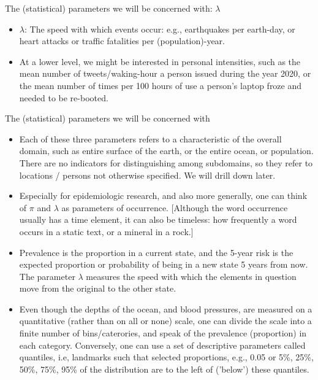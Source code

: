 \documentclass[10pt,handout]{beamer}\usepackage[]{graphicx}\usepackage[]{color}
\begin{document}
\begin{frame}{The (statistical) parameters we will be concerned with: $\lambda$}
	
	
	\begin{itemize}
			
		\item $\lambda$: The speed with which events occur: e.g., earthquakes per earth-day, or heart attacks or traffic fatalities per (population)-year. 
		\item At a lower level, we might be interested in personal intensities, such as the mean number of tweets/waking-hour  a person issued during the year 2020, or the mean number of times per 100 hours of use a person's laptop froze and needed to be re-booted.
		
	\end{itemize}
	
\end{frame}



\begin{frame}{The (statistical) parameters we will be concerned with}
	
	
	\begin{itemize}
		\item Each of these three parameters refers to a characteristic of the overall domain, such as entire surface of the earth, or the entire ocean, or population. There are no indicators for distinguishing among subdomains, so they refer to locations / persons not otherwise specified. We will drill down  later. \pause 
		
		\item Especially for epidemiologic research, and also more generally, one can think  of $\pi$ and $\lambda$ as  parameters of occurrence. [Although the word occurrence usually has a time element, it can also be timeless: how frequently a word occurs in a static text, or a mineral in a rock.] \pause 
		
		\item Prevalence is the proportion in a current state, and the 5-year risk is the expected proportion or probability of being in a new state 5 years from now. The  parameter $\lambda$ measures the speed with which the  elements in question move from the original to the other state.\pause 
		
		\item Even though the depths of the ocean, and blood pressures, are measured on a quantitative (rather than on all or none) scale, one can divide the scale into a finite number of bins/caterories, and speak of the prevalence (proportion) in each category. Conversely, one can use a set of descriptive parameters called quantiles, i.e, landmarks such that selected proportions, e.g., 0.05 or 5\%, 25\%, 50\%, 75\%, 95\% of the distribution are to the left of ('below') these quantiles.
	\end{itemize}
	
\end{frame}
\end{document}
